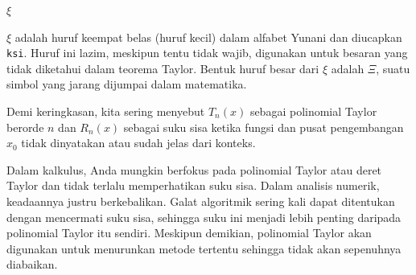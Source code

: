 \noindent\begin{digression}{$\xi$}  

\noindent$\xi$ adalah huruf keempat belas (huruf kecil) dalam alfabet
Yunani dan diucapkan \texttt{ksi}. Huruf ini lazim, meskipun tentu
tidak wajib, digunakan untuk besaran yang tidak diketahui dalam teorema
Taylor. Bentuk huruf besar dari $\xi$ adalah $\Xi$, suatu simbol
yang jarang dijumpai dalam matematika. \end{digression}

Demi keringkasan, kita sering menyebut $T_{n}(x)$ sebagai polinomial
Taylor berorde $n$ dan $R_{n}(x)$ sebagai suku sisa ketika fungsi
dan pusat pengembangan $x_{0}$ tidak dinyatakan atau sudah jelas
dari konteks.

Dalam kalkulus, Anda mungkin berfokus pada polinomial Taylor atau
deret Taylor dan tidak terlalu memperhatikan suku sisa. Dalam analisis
numerik, keadaannya justru berkebalikan. Galat algoritmik sering kali
dapat ditentukan dengan mencermati suku sisa, sehingga suku ini menjadi
lebih penting daripada polinomial Taylor itu sendiri. Meskipun demikian,
polinomial Taylor akan digunakan untuk menurunkan metode tertentu
sehingga tidak akan sepenuhnya diabaikan.

